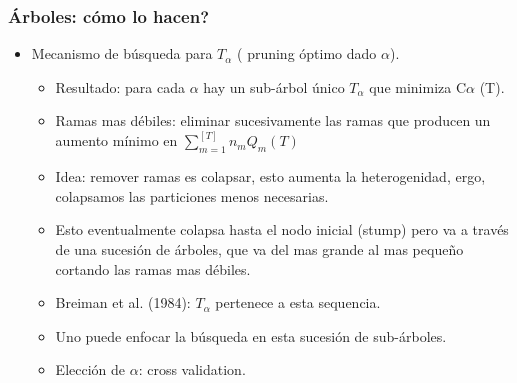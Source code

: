\documentclass[
  shownotes,
  xcolor={svgnames},
  hyperref={colorlinks,citecolor=DarkBlue,linkcolor=DarkRed,urlcolor=DarkBlue}
  , aspectratio=169]{beamer}
\begin{document}
\begin{frame}[fragile]
\frametitle{Árboles: cómo lo hacen?}

\begin{itemize}
\item Mecanismo de búsqueda para $T_\alpha$ ( pruning óptimo dado  $\alpha$).
\begin{itemize}
\item Resultado: para cada  $\alpha$ hay un sub-árbol único  $T_\alpha$ que minimiza  C$\alpha$ (T).
\medskip
\item Ramas mas débiles: eliminar sucesivamente las ramas que producen un aumento mínimo en  $\sum_{m=1}^{[T]} n_m  Q_m (T)$
\medskip
\item Idea: remover ramas es colapsar, esto aumenta la heterogenidad, ergo, colapsamos las particiones menos necesarias.
\medskip
\item Esto eventualmente colapsa hasta el nodo inicial (stump) pero va a través de una sucesión de árboles, que va del mas grande al mas pequeño cortando las ramas mas débiles.

\medskip
\item Breiman et al. (1984): $T_\alpha$ pertenece a esta sequencia. 
\medskip
\item Uno puede enfocar la búsqueda en esta sucesión de sub-árboles.
\medskip
\item Elección de $\alpha$: cross validation.
\end{itemize}

\end{itemize}




\end{frame}
\end{document}
